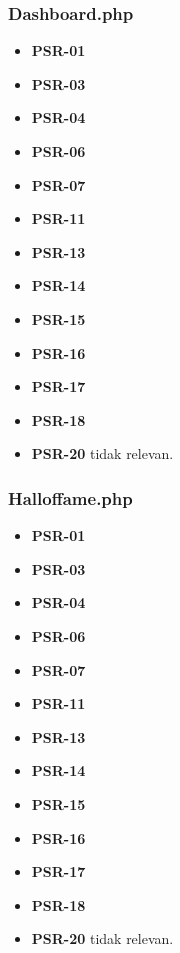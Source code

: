 \subsubsection{Dashboard.php} 
\begin{itemize}
	\item \textbf{PSR-01} 
	\item \textbf{PSR-03}
	\item \textbf{PSR-04}
	\item \textbf{PSR-06}
	\item \textbf{PSR-07}
	\item \textbf{PSR-11}
	\item \textbf{PSR-13}
	\item \textbf{PSR-14}
	\item \textbf{PSR-15}
	\item \textbf{PSR-16}
	\item \textbf{PSR-17} 
	\item \textbf{PSR-18} 
	\item \textbf{PSR-20} tidak relevan.
\end{itemize}

\subsubsection{Halloffame.php}
\begin{itemize}
	\item \textbf{PSR-01} 
	\item \textbf{PSR-03}
	\item \textbf{PSR-04}
	\item \textbf{PSR-06}
	\item \textbf{PSR-07}
	\item \textbf{PSR-11}
	\item \textbf{PSR-13}
	\item \textbf{PSR-14}
	\item \textbf{PSR-15}
	\item \textbf{PSR-16}
	\item \textbf{PSR-17} 
	\item \textbf{PSR-18} 
	\item \textbf{PSR-20} tidak relevan.
\end{itemize}

